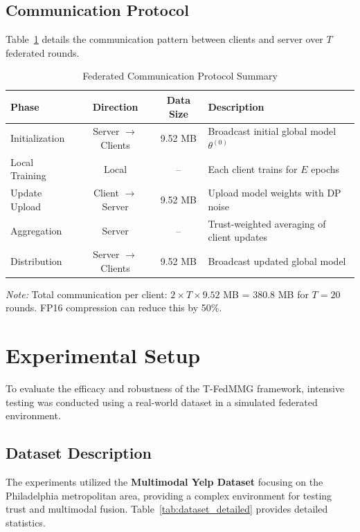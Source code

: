 \documentclass[12pt,a4paper]{report}
\begin{document}
{\subsection{Communication Protocol}
Table~\ref{tab:comm_protocol} details the communication pattern between clients and server over $T$ federated rounds.

\begin{table}[htbp]
\centering
\small
\caption{Federated Communication Protocol Summary}
\label{tab:comm_protocol}
\begin{tabular}{|l|c|c|p{4cm}|}
\hline
\textbf{Phase} & \textbf{Direction} & \textbf{Data Size} & \textbf{Description} \\ \hline
Initialization & Server $\to$ Clients & 9.52 MB & Broadcast initial global model $\theta^{(0)}$ \\ \hline
Local Training & Local & -- & Each client trains for $E$ epochs \\ \hline
Update Upload & Client $\to$ Server & 9.52 MB & Upload model weights with DP noise \\ \hline
Aggregation & Server & -- & Trust-weighted averaging of client updates \\ \hline
Distribution & Server $\to$ Clients & 9.52 MB & Broadcast updated global model \\ \hline
\end{tabular}
\end{table}

\textit{Note:} Total communication per client: $2 \times T \times 9.52$ MB = 380.8 MB for $T=20$ rounds. FP16 compression can reduce this by 50\%.

\section{Experimental Setup}
To evaluate the efficacy and robustness of the T-FedMMG framework, intensive testing was conducted using a real-world dataset in a simulated federated environment.

\subsection{Dataset Description}
The experiments utilized the \textbf{Multimodal Yelp Dataset} focusing on the Philadelphia metropolitan area, providing a complex environment for testing trust and multimodal fusion. Table~\ref{tab:dataset_detailed} provides detailed statistics.

}
\end{document}
